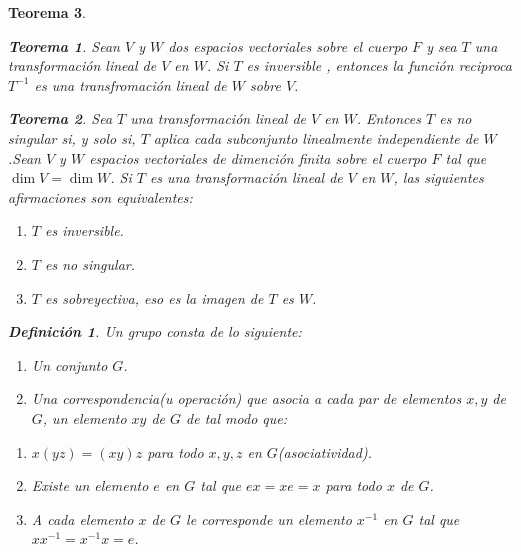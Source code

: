 \documentclass[b5paper, 11pt]{book}
\newcommand{\0}{\mathbf{0}}
\theoremstyle{estiloB}
\theoremstyle{estiloC}
\newtheorem{unteo}{Teorema}[chapter]
\newtheorem{unadefi}{Definición}[chapter]
\theoremstyle{estiloD}
\theoremstyle{estiloE}
\begin{document}
\begin{unteo}
\begin{unteo}
Sean $V$ y $W$ dos espacios vectoriales sobre el cuerpo $F$ y sea $T$ una transformaci\'on lineal de $V$ en $W$. Si $T$ es inversible , entonces la funci\'on reciproca $T^{-1}$ es una transfromaci\'on lineal de $W$ sobre $V$.
\end{unteo}

\begin{unteo}
Sea $T$ una transformaci\'on lineal de $V$ en $W$. Entonces $T$ es no singular si, y solo si, $T$ aplica cada subconjunto linealmente independiente de $W$.Sean $V$ y $W$ espacios vectoriales de dimenci\'on finita sobre el cuerpo $F$ tal que $\dim V = \dim W$. Si $T$ es una transformaci\'on lineal de $V$ en $W$, las siguientes afirmaciones son equivalentes:
\begin{enumerate}
\item[i.] $T$ es inversible.
\item[ii.] $T$ es no singular. 
\item[iii.] $T$ es sobreyectiva, eso es la imagen de $T$ es $W$. 
\end{enumerate}
\end{unteo}

\begin{unadefi}
Un \textit{grupo} consta de lo siguiente:
\begin{enumerate}
\item[i.] Un conjunto $G$.
\item[ii.] Una correspondencia(u operaci\'on) que asocia a cada par de elementos $x,y$ de $G$, un elemento $xy$ de $G$ de tal modo que: 
\end{enumerate}
\begin{enumerate}
\item[a.] $x(yz) = (xy)z$ para todo $x,y,z$ en $G$\textit{(asociatividad)}.
\item[b.] Existe un elemento $e$ en $G$ tal que $ex = xe = x$ para todo $x$ de $G$.
\item[c.] A cada elemento $x$ de $G$ le corresponde un elemento $x^{-1}$ en $G$ tal que $xx^{-1} = x^{-1}x = e$. 
\end{enumerate}
\end{unadefi}


\end{unteo}
\end{document}
